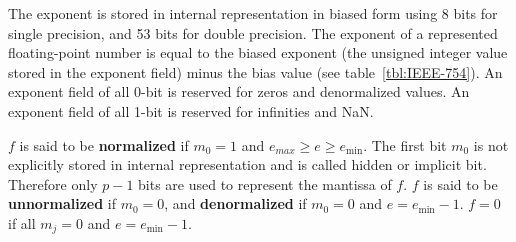   \begin{comment}
  Let $\F$ be the set of all floating-point numbers $f = sm2^e$ represented in some binary IEEE 754-2008 format \cite{ieee754} where $s \in \{1, -1\}$ is the \textbf{sign},
  $e \in \Z$, $e_{\max} \geq e \geq e_{\min}$ is the \textbf{exponent} ($\exp(f)$ is
  defined to be $e$), $p \in \Z, p > 1$ is the \textbf{precision},
  and $m=m_0.m_1m_2...m_{p-1}$ where $m_0, ..., m_{p - 1} \in \{0, 1\}$ is the
  \textbf{significand} of $f$. Assume that the representation of $f$ is made unique using the ``hidden bit'' convention, so that $f$ is represented using the smallest exponent possible. (In memory, the bit $m_0$ is not stored and assumed to be 1 unless the exponent field contains a special value signaling both that $e = e_{\min}$ and $m_0=0$).
  $f$ is said to be \textbf{normalized} if $m_0 =1$
  and $e \geq e_{\min}$, \textbf{unnormalized} if $m_0 = 0$, and
  \textbf{denormalized} if $m_0 = 0$ and $e = e_{\min}$. $f = 0$ if all $m_j = 0$
  and $e = e_{\min}$.

  Assume that floating point arithmetic complies with the IEEE 754-2008
  standard \cite{ieee754} in some ``to nearest'' rounding mode (no specific tie
  breaking behaviour is required) and that underflow occurs gradually, although
  methods to handle abrupt underflow will be considered in Section
  \ref{sec:indexed_underflow_abrupt}.

  Let $f = sm2^e \in \F$ be a floating-point number represented in IEEE
  754-2008 format \cite{ieee754} where $s \in \{1, -1\}$ is the \textbf{sign},
  $e_{\max} \geq e \geq e_{\min}$ is the \textbf{exponent} ($\exp(f)$ is
  defined to be $e$), $p$ is the \textbf{precision},
  and $m=m_0.m_1m_2...m_{p-1}$ where $m_0, ..., m_{p - 1} \in \{0, 1\}$ is the
  \textbf{significand} of $f$.
  \end{comment}

  The exponent is stored in internal representation in biased form
  using 8 bits for single precision, and 53 bits for double precision.
  The exponent of a represented floating-point number is equal to
  the biased exponent (the unsigned integer value stored in the exponent field)
  minus the bias value (see table~\ref{tbl:IEEE-754}).
  An exponent field of all 0-bit is reserved for zeros and denormalized values.
  An exponent field of all 1-bit is reserved for infinities and NaN.

  $f$ is said to be \textbf{normalized} if $m_0 =1$
  and $e_{max} \geq e \geq e_{\min}$.
  The first bit $m_0$ is not explicitly stored in internal representation
  and is called hidden or implicit bit.
  Therefore only $p-1$ bits are used to represent the mantissa of $f$.
  $f$ is said to be \textbf{unnormalized} if $m_0 = 0$, and
  \textbf{denormalized} if $m_0 = 0$ and $e = e_{\min} - 1$.
  $f = 0$ if all $m_j = 0$ and $e = e_{\min} - 1$.

